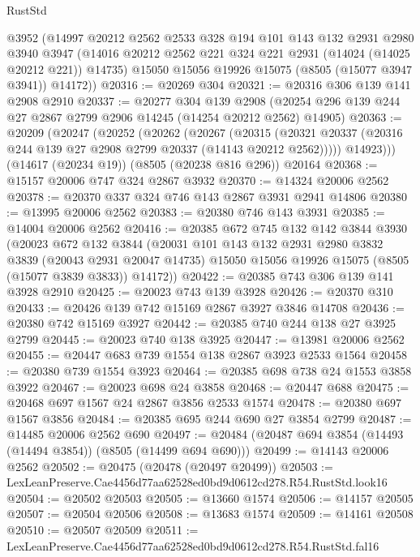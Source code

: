 \begin{lexlean}{RustStd}
\begin{coremodule}
      @3952
      (@14997
        @20212
        @2562
        @2533
        @328
        @194
        @101
        @143
        @132
        @2931
        @2980
        @3940
        @3947
        (@14016 @20212 @2562 @221 @324 @221 @2931 (@14024 (@14025 @20212 @221)) @14735)
        @15050
        @15056
        @19926
        @15075
        (@8505 (@15077 @3947 @3941))
        @14172))
@20316 := @20269 @304
@20321 := @20316 @306 @139 @141 @2908 @2910
@20337 := @20277
    @304
    @139
    @2908
    (@20254 @296 @139 @244 @27 @2867 @2799 @2906 @14245 (@14254 @20212 @2562) @14905)
@20363 := @20209
    (@20247
      (@20252
        (@20262
          (@20267
            (@20315
              (@20321 @20337 (@20316 @244 @139 @27 @2908 @2799 @20337 (@14143 @20212 @2562)))))
          @14923)))
    (@14617 (@20234 @19))
    (@8505 (@20238 @816 @296))
    @20164
@20368 := @15157 @20006 @747 @324 @2867 @3932
@20370 := @14324 @20006 @2562
@20378 := @20370 @337 @324 @746 @143 @2867 @3931 @2941 @14806
@20380 := @13995 @20006 @2562
@20383 := @20380 @746 @143 @3931
@20385 := @14004 @20006 @2562
@20416 := @20385
    @672
    @745
    @132
    @142
    @3844
    @3930
    (@20023
      @672
      @132
      @3844
      (@20031
        @101
        @143
        @132
        @2931
        @2980
        @3832
        @3839
        (@20043 @2931 @20047 @14735)
        @15050
        @15056
        @19926
        @15075
        (@8505 (@15077 @3839 @3833))
        @14172))
@20422 := @20385 @743 @306 @139 @141 @3928 @2910
@20425 := @20023 @743 @139 @3928
@20426 := @20370 @310
@20433 := @20426 @139 @742 @15169 @2867 @3927 @3846 @14708
@20436 := @20380 @742 @15169 @3927
@20442 := @20385 @740 @244 @138 @27 @3925 @2799
@20445 := @20023 @740 @138 @3925
@20447 := @13981 @20006 @2562
@20455 := @20447 @683 @739 @1554 @138 @2867 @3923 @2533 @1564
@20458 := @20380 @739 @1554 @3923
@20464 := @20385 @698 @738 @24 @1553 @3858 @3922
@20467 := @20023 @698 @24 @3858
@20468 := @20447 @688
@20475 := @20468 @697 @1567 @24 @2867 @3856 @2533 @1574
@20478 := @20380 @697 @1567 @3856
@20484 := @20385 @695 @244 @690 @27 @3854 @2799
@20487 := @14485 @20006 @2562 @690
@20497 := @20484 (@20487 @694 @3854 (@14493 (@14494 @3854)) (@8505 (@14499 @694 @690)))
@20499 := @14143 @20006 @2562
@20502 := @20475 (@20478 (@20497 @20499))
@20503 := LexLeanPreserve.Cae4456d77aa62528ed0bd9d0612cd278.R54.RustStd.look16
@20504 := @20502 @20503
@20505 := @13660 @1574
@20506 := @14157 @20505
@20507 := @20504 @20506
@20508 := @13683 @1574
@20509 := @14161 @20508
@20510 := @20507 @20509
@20511 := LexLeanPreserve.Cae4456d77aa62528ed0bd9d0612cd278.R54.RustStd.fal16

\end{coremodule}
\end{lexlean}
